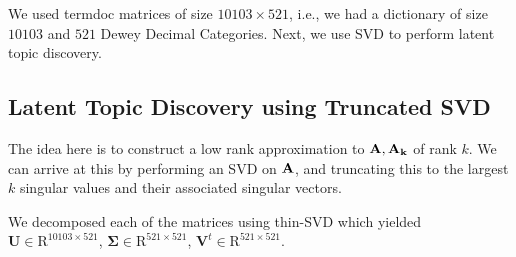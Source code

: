 \documentclass[article]{article}
\begin{document}
We used termdoc matrices of size $10103 \times 521$, i.e., we had a dictionary of size $10103$ and $521$ Dewey Decimal Categories. Next, we use SVD to perform latent topic discovery.

\subsection{Latent Topic Discovery using Truncated SVD}
The idea here is to construct a low rank approximation to $\bf A, A_k$ of rank $k$. We can arrive at this by performing an SVD on $\bf A$, and truncating this to the largest $k$ singular values and their associated singular vectors.\bigskip

We decomposed each of the matrices using thin-SVD which yielded $\mathbf{U} \in \mathrm{R}^{10103 \times 521}$, $\mathbf{\Sigma} \in \mathrm{R}^{521 \times 521}$, $\mathbf{V}^t \in \mathrm{R}^{521 \times 521}$.
\end{document}
